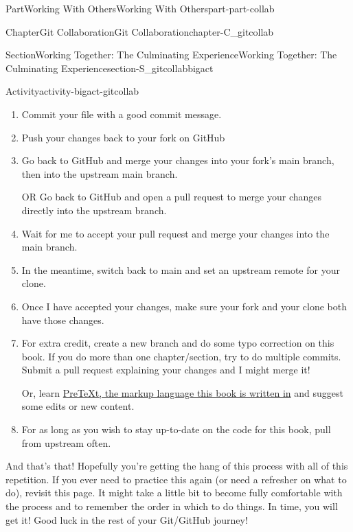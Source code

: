 \documentclass[oneside,10pt,]{book}
\begin{document}
\begin{partptx}{Part}{Working With Others}{}{Working With Others}{}{}{part-part-collab}
\begin{chapterptx}{Chapter}{Git Collaboration}{}{Git Collaboration}{}{}{chapter-C_gitcollab}
\begin{sectionptx}{Section}{Working Together: The Culminating Experience}{}{Working Together: The Culminating Experience}{}{}{section-S_gitcollabbigact}
\begin{activity}{Activity}{}{activity-bigact-gitcollab}
\begin{enumerate}[font=\bfseries,label=(\alph*),ref=\alph*]
\item{}Commit your file with a good commit message.%
\item{}Push your changes back to your fork on GitHub%
\item{}Go back to GitHub and merge your changes into your fork's main branch, then into the upstream main branch.%
\par
OR Go back to GitHub and open a pull request to merge your changes directly into the upstream branch.%
\item{}Wait for me to accept your pull request and merge your changes into the main branch.%
\item{}In the meantime, switch back to main and set an upstream remote for your clone.%
\item{}Once I have accepted your changes, make sure your fork and your clone both have those changes.%
\item{}For extra credit, create a new branch and do some typo correction on this book. If you do more than one chapter\slash{}section, try to do multiple commits. Submit a pull request explaining your changes and I might merge it!%
\par
Or, learn \href{https://pretextbook.org}{PreTeXt, the markup language this book is written in}\footnotemark{} and suggest some edits or new content.%
\item{}For as long as you wish to stay up-to-date on the code for this book, pull from upstream often.%
\end{enumerate}%
\end{activity}%
%
%
And that's that! Hopefully you're getting the hang of this process with all of this repetition. If you ever need to practice this again (or need a refresher on what to do), revisit this page. It might take a little bit to become fully comfortable with the process and to remember the order in which to do things. In time, you will get it! Good luck in the rest of your Git\slash{}GitHub journey!%
\end{sectionptx}
\end{chapterptx}
\end{partptx}
%
\appendix%
%
\end{document}
